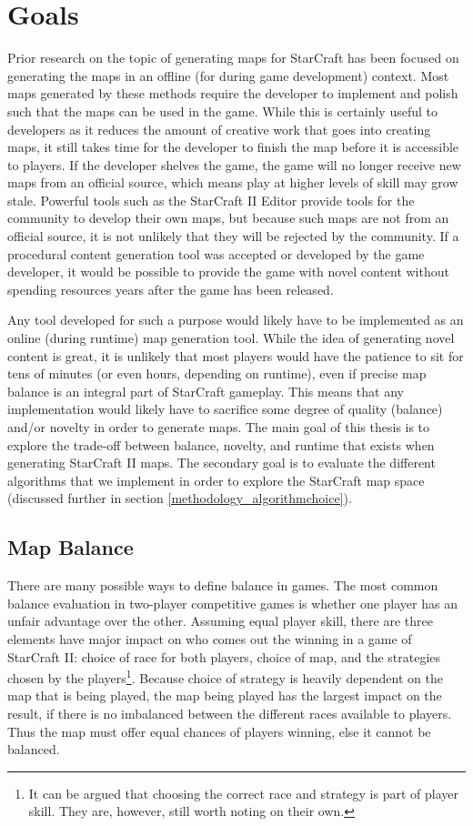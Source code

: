 \chapter{Goals}
\label{goals}
Prior research on the topic of generating maps for StarCraft has been focused on generating the maps in an offline (for during game development) context. Most maps generated by these methods require the developer to implement and polish such that the maps can be used in the game. While this is certainly useful to developers as it reduces the amount of creative work that goes into creating maps, it still takes time for the developer to finish the map before it is accessible to players. If the developer shelves the game, the game will no longer receive new maps from an official source, which means play at higher levels of skill may grow stale. Powerful tools such as the StarCraft II Editor provide tools for the community to develop their own maps, but because such maps are not from an official source, it is not unlikely that they will be rejected by the community. If a procedural content generation tool was accepted or developed by the game developer, it would be possible to provide the game with novel content without spending resources years after the game has been released.

Any tool developed for such a purpose would likely have to be implemented as an online (during runtime) map generation tool. While the idea of generating novel content is great, it is unlikely that most players would have the patience to sit for tens of minutes (or even hours, depending on runtime), even if precise map balance is an integral part of StarCraft gameplay. This means that any implementation would likely have to sacrifice some degree of quality (balance) and/or novelty in order to generate maps. The main goal of this thesis is to explore the trade-off between balance, novelty, and runtime that exists when generating StarCraft II maps. The secondary goal is to evaluate the different algorithms that we implement in order to explore the StarCraft map space (discussed further in section \ref{methodology_algorithmchoice}).

\section{Map Balance}
\label{goals_balance}
There are many possible ways to define balance in games. The most common balance evaluation in two-player competitive games is whether one player has an unfair advantage over the other. Assuming equal player skill, there are three elements have major impact on who comes out the winning in a game of StarCraft II: choice of race for both players, choice of map, and the strategies chosen by the players\footnote{It can be argued that choosing the correct race and strategy is part of player skill. They are, however, still worth noting on their own.}. Because choice of strategy is heavily dependent on the map that is being played, the map being played has the largest impact on the result, if there is no imbalanced between the different races available to players. Thus the map must offer equal chances of players winning, else it cannot be balanced.

